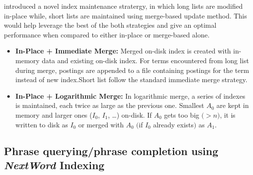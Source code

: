 \iffalse
\texttt Improving Merge-Based Inversion: 
\begin{itemize}
\item Constraining the number of blocks (for example, 4 per term) would allow the query time to be controlled.
\item Arranging the sequence as a sequence of subindexes will allow only a fraction of the index involved during merge operations. 
\end{itemize}
\fi


{\citet{bc06ecir}} introduced a novel index maintenance stratergy, in which long lists are modified in-place while, short lists are maintained using merge-based update method. This would help leverage the best of the both strategies and give an optimal performance when compared to either in-place or merge-based alone. 


\begin{itemize}
  \item \textbf{In-Place + Immediate Merge:}
  Merged on-disk index is created with in-memory data and existing on-disk index. For terms encountered from long list during merge, postings are appended to a file containing postings for the term instead of new index.Short list follow the standard immediate merge strategy.
  
  \item \textbf{In-Place + Logarithmic Merge:}
In logarithmic merge, a series of indexes is maintained, each twice as large as the 
previous one. Smallest  $A$$_{0}$ are kept in memory and larger ones ($I$$_{0}$, $I$$_{1}$, 
{\ldots}) on-disk. If $A$$_{0}$ gets too big $($$>$$n$$)$, it is written to disk as  $I$$_{0}$ or merged with 
$A$$_{0}$ $($if $I$$_{0}$ already exists$)$ as $A$$_{1}$. 
\end{itemize}



\subsection{Phrase querying/phrase completion using {\itshape NextWord} Indexing}
\begin{table*}[t]
\centering

\aftertabspace
\end{table*}


